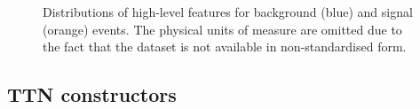 \documentclass[../main/main.tex]{subfiles}
\begin{document}
\begin{figure}[!h]
    \begin{minipage}[c]{0.333\linewidth}
        \vspace{0pt}
        \hfill
    \end{minipage}%
    \begin{minipage}[c]{0.333\linewidth}
        \vspace{0pt}
        \centering
    \end{minipage}%
    \begin{minipage}[c]{0.333\linewidth}
        \vspace{0pt}
        \hfill
    \end{minipage}%
    \caption{Distributions of high-level features for background (blue) and signal (orange) events. The physical units of measure are omitted due to the fact that the dataset is not available in non-standardised form.}
    \label{fig:appendix_high_features}
\end{figure}

\clearpage



\renewcommand{\lstlistingname}{\textbf{LST.}}
\renewcommand{\thelstlisting}{\textbf{\arabic{lstlisting}}}

\subsection{TTN constructors}
\label{ssec:appendix_constructors}
\end{document}

